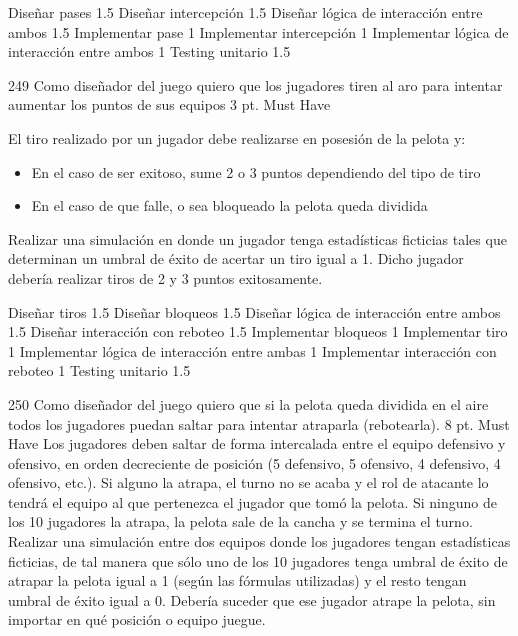 \begin{taskstable}
 \task
 {Diseñar pases}
 {1.5}
 \task
 {Diseñar intercepción}
 {1.5}
 \task
 {Diseñar lógica de interacción entre ambos}
 {1.5}
 \task
 {Implementar pase}
 {1}
 \task
 {Implementar intercepción}
 {1}
 \task
 {Implementar lógica de interacción entre ambos}
 {1}
 \task
 {Testing unitario}
 {1.5}
\end{taskstable}
 
 \vspace{1cm}

\sprintstory
{249}
{Como diseñador del juego quiero que los jugadores tiren al aro para intentar aumentar los puntos de sus equipos}
{3 pt.}
{Must Have}
{El tiro realizado por un jugador debe realizarse en posesión de la pelota y:
\begin{itemize}
	\item En el caso de ser exitoso, sume 2 o 3 puntos dependiendo del tipo de tiro
	\item En el caso de que falle, o sea bloqueado la pelota queda dividida
\end{itemize}}
{Realizar una simulación en donde un jugador tenga estadísticas ficticias tales que determinan un umbral de éxito de acertar un tiro igual a 1.
Dicho jugador debería realizar tiros de 2 y 3 puntos exitosamente.}

\begin{taskstable}
 \task
 {Diseñar tiros}
 {1.5}
 \task
 {Diseñar bloqueos}
 {1.5}
 \task
 {Diseñar lógica de interacción entre ambos}
 {1.5}
 \task
 {Diseñar interacción con reboteo}
 {1.5}
 \task
 {Implementar bloqueos}
 {1}
 \task
 {Implementar tiro}
 {1}
 \task
 {Implementar lógica de interacción entre ambas}
 {1}
 \task
 {Implementar interacción con reboteo}
 {1}
 \task
 {Testing unitario}
 {1.5}
\end{taskstable}

\vspace{1cm}


\sprintstory
{250}
{Como diseñador del juego quiero que si la pelota queda dividida en el aire todos los jugadores puedan saltar para intentar atraparla (rebotearla).}
{8 pt.}
{Must Have}
{Los jugadores deben saltar de forma intercalada entre el equipo defensivo y ofensivo, en orden decreciente de posición (5 defensivo, 5 ofensivo, 4 defensivo, 4 ofensivo, etc.). Si alguno la atrapa, el turno no se acaba y el rol de atacante lo tendrá el equipo al que pertenezca el jugador que tomó la pelota. Si ninguno de los 10 jugadores la atrapa, la pelota sale de la cancha y se termina el turno.}
{Realizar una simulación entre dos equipos donde los jugadores tengan estadísticas ficticias, de tal manera que sólo uno de los 10 jugadores tenga umbral de éxito de atrapar la pelota igual a 1 (según las fórmulas utilizadas) y el resto tengan umbral de éxito igual a 0. Debería suceder que ese jugador atrape la pelota, sin importar en qué posición o equipo juegue.}

